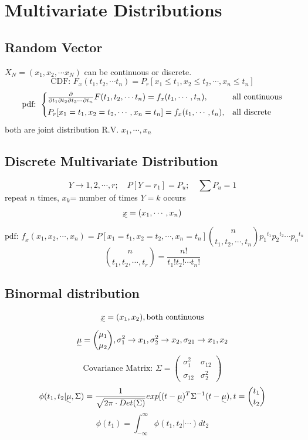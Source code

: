 \documentclass{article}
\begin{document}
\section{Multivariate Distributions}{
    \subsection{Random Vector}{

        \(X_N=(x_1, x_2, \cdots x_N)\) can be continuous or discrete.
        \[\text{CDF: } F_x(t_1, t_2, \cdots t_n)= P_r[x_1\leqslant t_1,x_2\leqslant t_2, \cdots, x_n\leqslant t_n]\]
        \[\text{pdf: } \begin{cases}
            \frac{\partial}{\partial t_1 \partial t_2 \partial t_3 \cdots \partial t_n} F(t_1, t_2, \cdots t_n)= f_{\uwave{x}}(t_1, \cdots, t_n), & \text{all continuous}\\
            P_r[x_1= t_1,x_2= t_2, \cdots, x_n= t_n]=f_{x}(t_1, \cdots, t_n), & \text{all discrete}
        \end{cases}\]
        both are joint distribution R.V. $x_1, \cdots, x_n$
    }
    \subsection{Discrete Multivariate Distribution}{
        \[ Y\rightarrow 1, 2, \cdots, r; \quad P[Y=r_1]=P_u; \quad \sum P_u= 1\]
        repeat $n$ times, $x_k$= number of times $Y = k$ occurs 
        \[\uwave{x}= (x_1, \cdots, x_n)\]
        \[\text{pdf: } \mathit{f_x}(x_1, x_2, \cdots, x_n) = P[x_1=t_1, x_2=t_2, \cdots, x_n=t_n]{n \choose t_1, t_2, \cdots, t_n}{p_1}^{t_1}{p_2}^{t_2}\cdots{p_n}^{t_n}\]
        \[{n \choose t_1, t_2, \cdots, t_r}= \frac{n !}{t_1! t_2! \cdots t_n!}\]
    }
    \subsection{Binormal distribution}{
        \[\uwave{x}=(x_1,x_2), \text{both continuous}\]
        \[\uwave{\mu}= { \mu_1 \choose \mu_2}, \sigma_1^2 \rightarrow x_1, \sigma_2^2 \rightarrow x_2, \sigma_{21} \rightarrow x_1,x_2 \]
        \[\text{Covariance Matrix: } 
        \Sigma= \begin{pmatrix} 
            \sigma_1^2 & \sigma_{12} \\ 
            \sigma_{12} & \sigma_2^2 
        \end{pmatrix} \]
        \[ \phi(t_1,t_2| \uwave{\mu}, \Sigma)= \frac{1}{\sqrt{2 \pi \cdot Det(\Sigma)}}exp[( \uwave{ t } -\uwave{\mu})^T \Sigma^{-1} (\uwave{t} -\uwave{\mu}),  \uwave{t} ={ t_1 \choose t_2} \]
        \[\phi(t_1)= \int_{-\infty}^{\infty} \phi(t_1,t_2| \cdots) dt_2\]

}}
\end{document}
